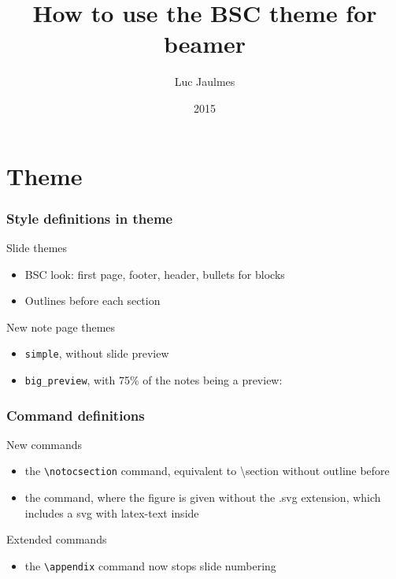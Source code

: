 \documentclass[c,12pt]{beamer}
\title[BSC styled beamer tutorial]{How to use the BSC theme for beamer}
\author{Luc Jaulmes}
\date{2015}
\begin{document}
\begin{frame}
\titlepage
\end{frame}

\section{Theme}

\begin{frame}[fragile]
	\frametitle{Style definitions in theme}
	\begin{block}{Slide themes}
		\begin{itemize}
			\item BSC look: first page, footer, header, bullets for blocks
			\item Outlines before each section
		\end{itemize}
	\end{block}
	\pause
	\begin{block}{New note page themes}
		\begin{itemize}
			\item \verb|simple|, without slide preview
			\item \verb|big_preview|, with 75\% of the notes being a preview:
		\end{itemize}%
		\begin{center}
		\end{center}
	\end{block}
\end{frame}

\begin{frame}[fragile]
	\frametitle{Command definitions}
	\begin{block}{New commands}
		\begin{itemize}
			\item the \verb|\notocsection| command, equivalent to \textbackslash section without outline before
			\item the \verb|| command, where the figure is given without the .svg extension, which includes a svg with latex-text inside
		\end{itemize}
	\end{block}
	\pause
	\begin{block}{Extended commands}
		\begin{itemize}
			\item the \verb|\appendix| command now stops slide numbering
		\end{itemize}
	\end{block}
\end{frame}
\end{document}
